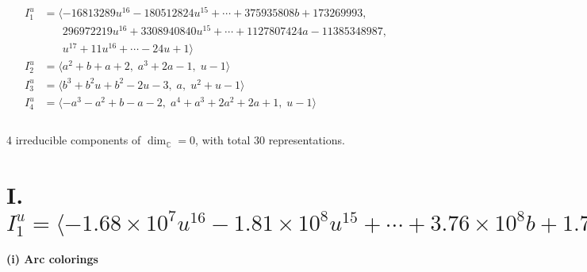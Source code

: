 \documentclass[1p]{elsarticle_modified}
\theoremstyle{definition}
\begin{document}
\begin{align*}
I^u_{1}&=\langle 
-16813289 u^{16}-180512824 u^{15}+\cdots+375935808 b+173269993,\\
\phantom{I^u_{1}}&\phantom{= \langle  }296972219 u^{16}+3308940840 u^{15}+\cdots+1127807424 a-11385348987,\\
\phantom{I^u_{1}}&\phantom{= \langle  }u^{17}+11 u^{16}+\cdots-24 u+1\rangle \\
I^u_{2}&=\langle 
a^2+b+a+2,\;a^3+2 a-1,\;u-1\rangle \\
I^u_{3}&=\langle 
b^3+b^2 u+b^2-2 u-3,\;a,\;u^2+u-1\rangle \\
I^u_{4}&=\langle 
- a^3- a^2+b- a-2,\;a^4+a^3+2 a^2+2 a+1,\;u-1\rangle \\
\\
\end{align*}
\raggedright * 4 irreducible components of $\dim_{\mathbb{C}}=0$, with total 30 representations.\\
\newpage
\renewcommand{\arraystretch}{1}
\centering \section*{I. $I^u_{1}= \langle -1.68\times10^{7} u^{16}-1.81\times10^{8} u^{15}+\cdots+3.76\times10^{8} b+1.73\times10^{8},\;2.97\times10^{8} u^{16}+3.31\times10^{9} u^{15}+\cdots+1.13\times10^{9} a-1.14\times10^{10},\;u^{17}+11 u^{16}+\cdots-24 u+1 \rangle$}
\flushleft \textbf{(i) Arc colorings}\\
\end{document}
